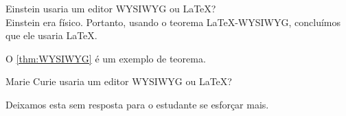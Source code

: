 \begin{example}
    Einstein usaria um editor WYSIWYG ou \LaTeX? \\
    Einstein era físico. Portanto, usando o teorema LaTeX-WYSIWYG, concluímos que ele usaria \LaTeX.
\end{example}

O \autoref{thm:WYSIWYG} é um exemplo de teorema.



\begin{exercise}
    Marie Curie usaria um editor WYSIWYG ou \LaTeX?
\end{exercise}

\begin{exercise}
    Deixamos esta sem resposta para o estudante se esforçar mais.
\end{exercise}